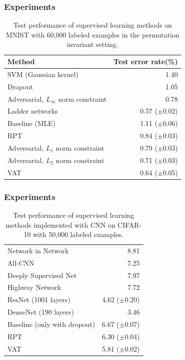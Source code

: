 \begin{frame}
    \frametitle{Experiments}
\begin{table}
\centering
\caption{Test performance of supervised learning methods
on MNIST with 60,000 labeled examples in the permutation
invariant setting.}
\label{tab:mnist}
\begin{tabular}{l r}
\hline
\hline
Method & Test error rate(\%)\\
\hline
SVM (Gaussian kernel) & 1.40\\
Dropout  & 1.05\\
Adversarial, \(L_\infty\) norm constraint &  0.78\\
Ladder networks &  0.57 (\(\pm\)0.02)\\
\hline
Baseline (MLE) & 1.11 (\(\pm\)0.06)\\
RPT & 0.84 (\(\pm\)0.03)\\
Adversarial, \(L_1\) norm constraint &0.79 (\(\pm\)0.03)\\
Adversarial, \(L_2\) norm constraint& 0.71 (\(\pm\)0.03)\\
VAT &0.64 (\(\pm\)0.05)\\
\hline
\hline
\end{tabular}
\end{table}
\end{frame}

\begin{frame}
    \frametitle{Experiments}

\begin{table}
\centering
\caption{Test performance of supervised learning methods
implemented with CNN on CIFAR-10 with 50,000 labeled
examples.}
\label{tab:ciphar10}
\begin{tabular}{l r}
\hline
\hline
Network in Network & 8.81\\
All-CNN & 7.25\\
Deeply Supervised Net & 7.97\\
Highway Network & 7.72\\
ResNet (1001 layers) & 4.62 (\(\pm\)0.20)\\
DenseNet (190 layers) & 3.46\\
\hline
Baseline (only with dropout) &6.67 (\(\pm\)0.07)\\
RPT &6.30 (\(\pm\)0.04)\\
VAT &5.81 (\(\pm\)0.02)\\
\hline
\hline
\end{tabular}
\end{table}

\end{frame}


